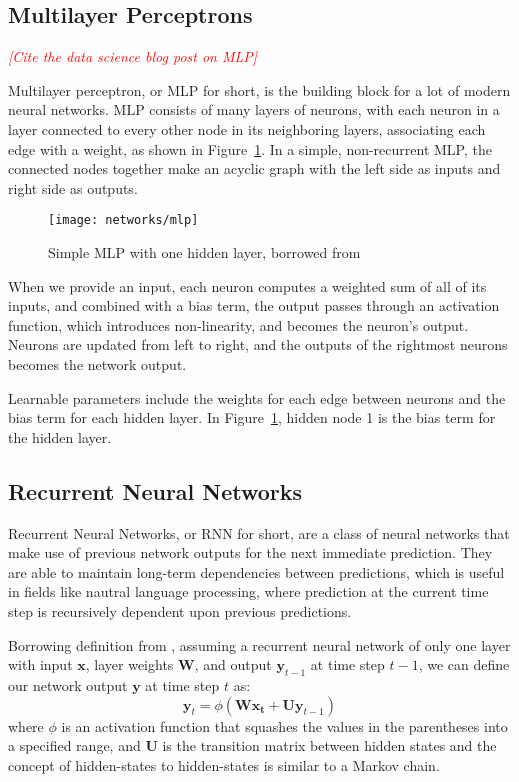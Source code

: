 \documentclass[12pt,onecolumn,letterpaper,draftclsnofoot]{article}
\newcommand{\todo}[1]{\textcolor{red}{{\em [#1]}} }
\newcommand{\figref}[1]{Figure~\ref{fig:#1}}
\newcommand{\matr}[1]{\mathbf{#1}}
\newcommand{\bs}[1]{\boldsymbol{#1}}
\begin{document}
\subsection{Multilayer Perceptrons}
\todo{Cite the data science blog post on MLP}

Multilayer perceptron, or MLP for short, is the building block for a lot of
modern neural networks. MLP consists of many layers of neurons, with each
neuron in a layer connected to every other node in its neighboring layers,
associating each edge with a weight, as shown in \figref{mlp}. In a simple,
non-recurrent MLP, the connected nodes together make an acyclic graph with the
left side as inputs and right side as outputs. 
 
\begin{figure}
  \centering
  \texttt{[image: networks/mlp]}
  \caption{Simple MLP with one hidden layer, borrowed from \cite{datasciencemlp}}
  \label{fig:mlp}
\end{figure}
 
When we provide an input, each neuron computes a weighted sum of all of its
inputs, and combined with a bias term, the output passes through an activation
function, which introduces non-linearity, and becomes the neuron's output.
Neurons are updated from left to right, and the outputs of the rightmost
neurons becomes the network output.

Learnable parameters include the weights for each edge between neurons and the
bias term for each hidden layer. In \figref{mlp}, hidden node 1 is the bias
term for the hidden layer.

\subsection{Recurrent Neural Networks}

Recurrent Neural Networks, or RNN for short, are a class of neural networks
that make use of previous network outputs for the next immediate prediction.
They are able to maintain long-term dependencies between predictions, which is
useful in fields like nautral language processing, where prediction at the
current time step is recursively dependent upon previous predictions.

Borrowing definition from \cite{deeplearning4jrnn}, assuming a recurrent
neural network of only one layer with input $\bm{x}$, layer weights $\bm{W}$,
and output $\bm{y}_{t-1}$ at time step $t-1$, we can define our network output
$\bs{y}$ at time step $t$ as:
%
\begin{equation}
  \bs{y}_t = \phi (\bm{W} \matr{x_t} + \bm{U} \bs{y}_{t-1})
\end{equation}
%
where $\phi$ is an activation function that squashes the values in the
parentheses into a specified range, and $\bm{U}$ is the transition matrix
between hidden states and the concept of hidden-states to hidden-states is
similar to a Markov chain.
\end{document}
